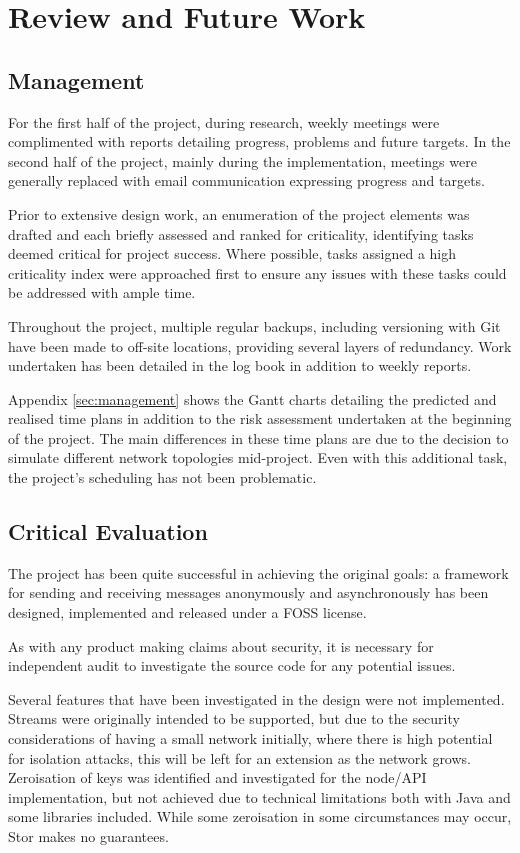 \section{Review and Future Work}

	\subsection{Management}
		For the first half of the project, during research, weekly meetings were complimented with reports detailing progress, problems and future targets. In the second half of the project, mainly during the implementation, meetings were generally replaced with email communication expressing progress and targets.
		
		Prior to extensive design work, an enumeration of the project elements was drafted and each briefly assessed and ranked for criticality, identifying tasks deemed critical for project success. Where possible, tasks assigned a high criticality index were approached first to ensure any issues with these tasks could be addressed with ample time.
		
		Throughout the project, multiple regular backups, including versioning with Git have been made to off-site locations, providing several layers of redundancy. Work undertaken has been detailed in the log book in addition to weekly reports.

		Appendix \ref{sec:management} shows the Gantt charts detailing the predicted and realised time plans in addition to the risk assessment undertaken at the beginning of the project. The main differences in these time plans are due to the decision to simulate different network topologies mid-project. Even with this additional task, the project's scheduling has not been problematic.
	\subsection{Critical Evaluation}
		The project has been quite successful in achieving the original goals: a framework for sending and receiving messages anonymously and asynchronously has been designed, implemented and released under a FOSS license. 
		
		As with any product making claims about security, it is necessary for independent audit to investigate the source code for any potential issues.
		
		Several features that have been investigated in the design were not implemented. Streams were originally intended to be supported, but due to the security considerations of having a small network initially, where there is high potential for isolation attacks, this will be left for an extension as the network grows. Zeroisation of keys was identified and investigated for the node/API implementation, but not achieved due to technical limitations both with Java and some libraries included. While some zeroisation in some circumstances may occur, Stor makes no guarantees.
		
